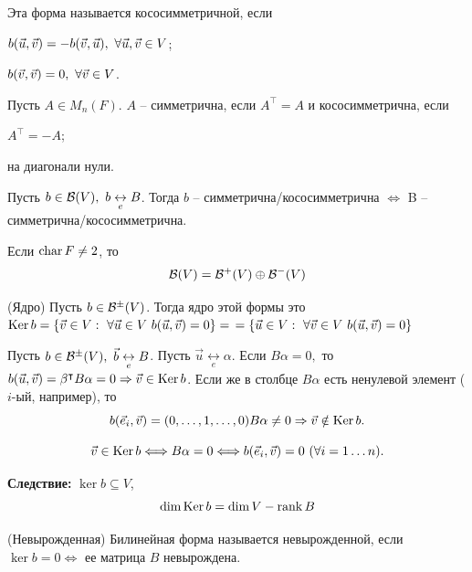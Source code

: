 \begin{multicols}{2}
\begin{definition}{}{}
\[    \]
    Эта форма называется кососимметричной, если
    \begin{enumerate*}
        \item $b(\vec{u}, \vec{v}) = -b(\vec{v}, \vec{u}), \ \forall \vec{u}, \vec{v} \in V$;
        \item $b(\vec{v}, \vec{v}) = 0, \ \forall \vec{v}\in V$.
    \end{enumerate*}
\end{definition}
\begin{definition}{}{}
    Пусть $A\in M_n(F)$. $A$ -- симметрична, если $A^\intercal = A$ и кососимметрична, если 
    \begin{enumerate*}
        \item $A^{\intercal} = -A$;
        \item на диагонали нули.
    \end{enumerate*}
\end{definition}
\begin{proposition}{}{}
    Пусть $b\in \calB(V), \ b\underset{e}{\leftrightarrow} B$. Тогда $b$ -- симметрична/кососимметрична $\Longleftrightarrow $ B -- симметрична/кососимметрична.
\end{proposition}
\begin{theorema}{}{}
    Если $\operatorname{char} F \neq 2$, то 
    \[
        \mathcal{B} (V) = \mathcal{B}^+ (V) \oplus \mathcal{B}^-(V)  
    \]
\end{theorema}
\begin{definition}{(Ядро)}{}
    Пусть $b \in \mathcal{B}^\pm(V)$. Тогда ядро этой формы это \mbox{$\ker b = \{\vv \in V: \ \forall \vvu \in V \ b(\vvu, \vv) = 0 \} = $} \mbox{$= \{\vec{u} \in V: \ \forall \vec{v} \in V \ b(\vec{u}, \vec{v}) = 0\}$}
\end{definition}
Пусть $b \in \calB^{\pm}(V), \ \vec{b}\underset{e}{\leftrightarrow} B$. Пусть $\vec{u} \underset{e}{\leftrightarrow} \alpha$. Если $B\alpha = 0, $ то $b(\vec{u}, \vec{v}) = \beta^\intercal B\alpha = 0 \Rightarrow \vec{v} \in \operatorname{Ker} b$. Если же в столбце $B\alpha$ есть ненулевой элемент ($i$-ый, например), то 
\[
    b(\vec{e}_i, \vec{v})  = (0, \ldots, 1, \ldots, 0)B\alpha \neq 0 \Rightarrow \vec{v} \notin \operatorname{Ker} b.
\]
\begin{proposition}{}{}
    \[
        \vec{v} \in \operatorname{Ker} b \Longleftrightarrow B\alpha = 0 \Longleftrightarrow b(\vec{e}_i, \vec{v}) = 0 \ (\forall i = 1\ldots n).
        \]
\end{proposition}
\textbf{Следствие: } $\ker b \subseteq V$, \[
    \dim \operatorname{Ker} b = \dim V - \rank B
    \]
\begin{definition}{(Невырожденная)}{}
    Билинейная форма называется невырожденной, если $\ker b = 0 \Longleftrightarrow$ ее матрица $B$ невырождена.

\end{definition}
\end{multicols}
